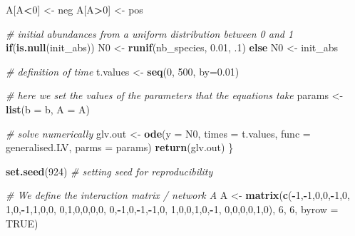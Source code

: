 \documentclass[
]{article}
\newenvironment{Shaded}{\begin{snugshade}}{\end{snugshade}}
\newcommand{\AttributeTok}[1]{\textcolor[rgb]{0.13,0.29,0.53}{#1}}
\newcommand{\CommentTok}[1]{\textcolor[rgb]{0.56,0.35,0.01}{\textit{#1}}}
\newcommand{\ConstantTok}[1]{\textcolor[rgb]{0.56,0.35,0.01}{#1}}
\newcommand{\ControlFlowTok}[1]{\textcolor[rgb]{0.13,0.29,0.53}{\textbf{#1}}}
\newcommand{\DecValTok}[1]{\textcolor[rgb]{0.00,0.00,0.81}{#1}}
\newcommand{\FloatTok}[1]{\textcolor[rgb]{0.00,0.00,0.81}{#1}}
\newcommand{\FunctionTok}[1]{\textcolor[rgb]{0.13,0.29,0.53}{\textbf{#1}}}
\newcommand{\NormalTok}[1]{#1}
\newcommand{\OtherTok}[1]{\textcolor[rgb]{0.56,0.35,0.01}{#1}}
\newcommand{\SpecialCharTok}[1]{\textcolor[rgb]{0.81,0.36,0.00}{\textbf{#1}}}
\begin{document}
\begin{Shaded}
\begin{Highlighting}[]
\NormalTok{  A[A}\SpecialCharTok{\textless{}}\DecValTok{0}\NormalTok{] }\OtherTok{\textless{}{-}}\NormalTok{ neg}
\NormalTok{  A[A}\SpecialCharTok{\textgreater{}}\DecValTok{0}\NormalTok{] }\OtherTok{\textless{}{-}}\NormalTok{ pos}
  
  \CommentTok{\# initial abundances from a uniform distribution between 0 and 1}
  \ControlFlowTok{if}\NormalTok{(}\FunctionTok{is.null}\NormalTok{(init\_abs))}
\NormalTok{    N0 }\OtherTok{\textless{}{-}} \FunctionTok{runif}\NormalTok{(nb\_species, }\FloatTok{0.01}\NormalTok{, .}\DecValTok{1}\NormalTok{)}
  \ControlFlowTok{else}
\NormalTok{    N0 }\OtherTok{\textless{}{-}}\NormalTok{ init\_abs}
  
  \CommentTok{\# definition of time}
\NormalTok{  t.values }\OtherTok{\textless{}{-}} \FunctionTok{seq}\NormalTok{(}\DecValTok{0}\NormalTok{, }\DecValTok{500}\NormalTok{, }\AttributeTok{by=}\FloatTok{0.01}\NormalTok{)}
  
  \CommentTok{\# here we set the values of the parameters that the equations take}
\NormalTok{  params }\OtherTok{\textless{}{-}} \FunctionTok{list}\NormalTok{(}\AttributeTok{b =}\NormalTok{ b, }\AttributeTok{A =}\NormalTok{ A)}
  
  \CommentTok{\# solve numerically}
\NormalTok{  glv.out }\OtherTok{\textless{}{-}} \FunctionTok{ode}\NormalTok{(}\AttributeTok{y =}\NormalTok{ N0, }\AttributeTok{times =}\NormalTok{ t.values, }\AttributeTok{func =}\NormalTok{ generalised.LV, }\AttributeTok{parms =}\NormalTok{ params)}
  \FunctionTok{return}\NormalTok{(glv.out)}
\NormalTok{\}}

\FunctionTok{set.seed}\NormalTok{(}\DecValTok{924}\NormalTok{)               }\CommentTok{\# setting seed for reproducibility}

\CommentTok{\# We define the interaction matrix / network A}
\NormalTok{A }\OtherTok{\textless{}{-}} \FunctionTok{matrix}\NormalTok{(}\FunctionTok{c}\NormalTok{(}\SpecialCharTok{{-}}\DecValTok{1}\NormalTok{,}\SpecialCharTok{{-}}\DecValTok{1}\NormalTok{,}\DecValTok{0}\NormalTok{,}\DecValTok{0}\NormalTok{,}\SpecialCharTok{{-}}\DecValTok{1}\NormalTok{,}\DecValTok{0}\NormalTok{,}
              \DecValTok{1}\NormalTok{,}\DecValTok{0}\NormalTok{,}\SpecialCharTok{{-}}\DecValTok{1}\NormalTok{,}\DecValTok{1}\NormalTok{,}\DecValTok{0}\NormalTok{,}\DecValTok{0}\NormalTok{,}
              \DecValTok{0}\NormalTok{,}\DecValTok{1}\NormalTok{,}\DecValTok{0}\NormalTok{,}\DecValTok{0}\NormalTok{,}\DecValTok{0}\NormalTok{,}\DecValTok{0}\NormalTok{,}
              \DecValTok{0}\NormalTok{,}\SpecialCharTok{{-}}\DecValTok{1}\NormalTok{,}\DecValTok{0}\NormalTok{,}\SpecialCharTok{{-}}\DecValTok{1}\NormalTok{,}\SpecialCharTok{{-}}\DecValTok{1}\NormalTok{,}\DecValTok{0}\NormalTok{,}
              \DecValTok{1}\NormalTok{,}\DecValTok{0}\NormalTok{,}\DecValTok{0}\NormalTok{,}\DecValTok{1}\NormalTok{,}\DecValTok{0}\NormalTok{,}\SpecialCharTok{{-}}\DecValTok{1}\NormalTok{,}
              \DecValTok{0}\NormalTok{,}\DecValTok{0}\NormalTok{,}\DecValTok{0}\NormalTok{,}\DecValTok{0}\NormalTok{,}\DecValTok{1}\NormalTok{,}\DecValTok{0}\NormalTok{), }\DecValTok{6}\NormalTok{, }\DecValTok{6}\NormalTok{, }\AttributeTok{byrow =} \ConstantTok{TRUE}\NormalTok{)}



\end{Highlighting}
\end{Shaded}
\end{document}
